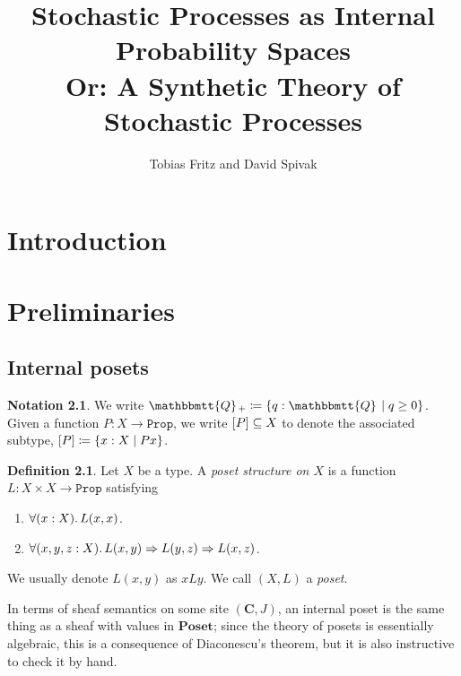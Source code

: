 \documentclass[11pt, oneside, article]{memoir}
\theoremstyle{plain}
\theoremstyle{definition}
\newtheorem{definition}[theorem]{Definition}
\newtheorem{notation}[theorem]{Notation}
\theoremstyle{remark}
\renewcommand{\ss}{\subseteq}
\DeclarePairedDelimiter{\subtype}{[}{]}
\newcommand{\const}[1]{\mathtt{#1}}
\newcommand{\Cat}[1]{\mathbf{#1}}
\newcommand{\internal}[1]{\raisebox{-.03ex}{$\mathbbmtt{#1}$}}
\newcommand{\hs}{\hspace{1.1pt}}
\newcommand{\tQQ}{\internal{Q}\hs}
\newcommand{\tQQp}{\tQQ_{+}}
\newcommand{\Prop}{\const{Prop}}
\newcommand{\Poset}{\Cat{Poset}}
\renewcommand{\C}{\Cat{C}}
\newcommand{\imp}{\Rightarrow}
\begin{document}
\title{Stochastic Processes as Internal Probability Spaces\\ Or: A Synthetic Theory of Stochastic Processes}

\author{Tobias Fritz and David Spivak}

\maketitle


\tableofcontents*



\chapter{Introduction}

\chapter{Preliminaries}

\section{Internal posets}

\begin{notation}
We write $\tQQp\coloneqq\{q:\tQQ\mid q\geq0\}$. Given a function $P:X\to\Prop$, we write $\subtype{P}\ss X$ to denote the associated subtype, $\subtype{P}\coloneqq\{x:X\mid Px\}$.
\end{notation}

\begin{definition}
Let $X$ be a type. A \emph{poset structure on $X$} is a function $L:X\times X\to\Prop$ satisfying
\begin{enumerate}
	\item $\forall(x:X)\ldotp L(x,x)$.
	\item $\forall(x,y,z:X)\ldotp L(x,y)\imp L(y,z)\imp L(x,z)$.
\end{enumerate}
We usually denote $L(x,y)$ as $x L y$. We call $(X,L)$ a \emph{poset}.
\end{definition}

In terms of sheaf semantics on some site $(\C,J)$, an internal poset is the same thing as a sheaf with values in $\Poset$; since the theory of posets is essentially algebraic, this is a consequence of Diaconescu's theorem, but it is also instructive to check it by hand.
\end{document}
